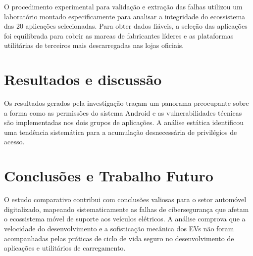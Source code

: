 \documentclass[a4paper]{article}
\begin{document}
O procedimento experimental para validação e extração das falhas utilizou um laboratório montado 
especificamente para analisar a integridade do ecossistema das 20 aplicações selecionadas. Para 
obter dados fiáveis, a seleção das aplicações foi equilibrada para cobrir as marcas de fabricantes 
líderes e as plataformas utilitárias de terceiros mais descarregadas nas lojas oficiais.

\section{Resultados e discussão}

Os resultados gerados pela investigação traçam um panorama preocupante sobre a forma como 
as permissões do sistema Android e as vulnerabilidades técnicas são implementadas nos dois grupos de aplicações. A análise estática identificou uma tendência sistemática para a acumulação desnecessária de privilégios de acesso.

\section{Conclusões e Trabalho Futuro}

O estudo comparativo contribui com conclusões valiosas para o setor automóvel digitalizado, 
mapeando sistematicamente as falhas de cibersegurança que afetam o ecossistema móvel de suporte 
aos veículos elétricos. A análise comprova que a velocidade do desenvolvimento 
e a sofisticação mecânica dos EVs não foram acompanhadas pelas práticas de ciclo de vida seguro 
no desenvolvimento de aplicações e utilitários de carregamento.

\newpage
\renewcommand{\refname}{Bibliografia}
\renewcommand{\bibname}{Bibliografia}
\printbibliography
\end{document}

